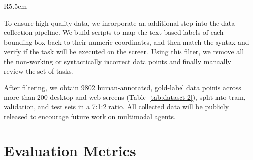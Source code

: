 \begin{wraptable}{R}{5.5cm}
\centering
\caption{Dataset distribution across splits and platforms.}
\label{tab:dataset-2}
\end{wraptable}

To ensure high-quality data, we incorporate an additional step into the data collection pipeline. We build scripts to map the text-based labels of each bounding box back to their numeric coordinates, and then match the syntax and verify if the task will be executed on the screen. Using this filter, we remove all the non-working or syntactically incorrect data points and finally manually review the set of tasks.

After filtering, we obtain 9802 human-annotated, gold-label data points across more than 200 desktop and web screens (Table~\ref{tab:dataset-2}), split into train, validation, and test sets in a 7:1:2 ratio. All collected data will be publicly released to encourage future work on multimodal agents.

\section{Evaluation Metrics}

